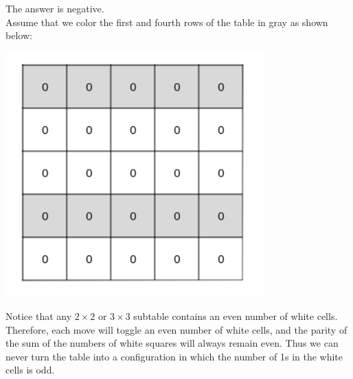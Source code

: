 \begin{solution}
The answer is negative.\\[0.2cm]
Assume that we color the first and fourth rows of the table in gray as shown below:

\begin{center}
	\includegraphics[width=10cm]{63/figs/63_sol2.png}
\end{center}

Notice that any $2 \times 2$ or $3 \times 3$ subtable contains an even number of white cells. Therefore, each move will toggle an even number of white cells, and the parity of the sum of the numbers of white squares will always remain even. Thus we can never turn the table into a configuration in which the number of 1s in the white cells is odd.
\end{solution}
